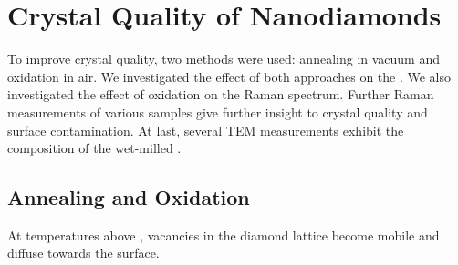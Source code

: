 
\chapter{Crystal Quality of Nanodiamonds}	\label{ch::crystal_quality}

To improve crystal quality, two methods were used: annealing in vacuum and oxidation in air.
We investigated the effect of both approaches on the \ZPL.
We also investigated the effect of oxidation on the Raman spectrum.
Further Raman measurements of various samples give further insight to crystal quality and surface contamination.
At last, several TEM measurements exhibit the composition of the wet-milled \nds. 

	\section{Annealing and Oxidation}

	At temperatures above , vacancies in the diamond lattice become mobile and diffuse towards the surface\cite{}.
	
